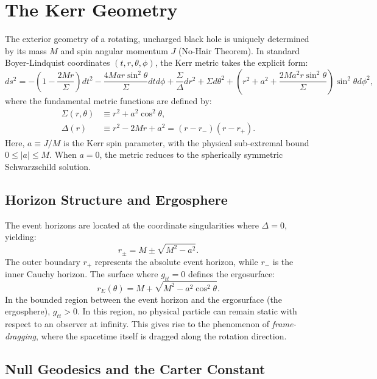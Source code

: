\documentclass[11pt]{book}
\begin{document}
\section{The Kerr Geometry}

The exterior geometry of a rotating, uncharged black hole is uniquely determined by its mass \(M\) and spin angular momentum \(J\) (No-Hair Theorem). In standard Boyer-Lindquist coordinates $(t, r, \theta, \phi)$, the Kerr metric takes the explicit form:
\begin{equation}
    ds^2 = -\left(1 - \frac{2Mr}{\Sigma}\right) dt^2 - \frac{4Mar\sin^2\theta}{\Sigma} dt d\phi + \frac{\Sigma}{\Delta} dr^2 + \Sigma d\theta^2 + \left(r^2 + a^2 + \frac{2Ma^2r\sin^2\theta}{\Sigma}\right)\sin^2\theta d\phi^2,
\end{equation}
where the fundamental metric functions are defined by:
\begin{align}
    \Sigma(r, \theta) &\equiv r^2 + a^2 \cos^2\theta, \\
    \Delta(r) &\equiv r^2 - 2Mr + a^2 = (r - r_-)(r - r_+).
\end{align}
Here, $a \equiv J/M$ is the Kerr spin parameter, with the physical sub-extremal bound $0 \leq |a| \leq M$. When $a = 0$, the metric reduces to the spherically symmetric Schwarzschild solution.

\subsection{Horizon Structure and Ergosphere}
The event horizons are located at the coordinate singularities where $\Delta = 0$, yielding:
\begin{equation}
    r_\pm = M \pm \sqrt{M^2 - a^2}.
\end{equation}
The outer boundary $r_+$ represents the absolute event horizon, while $r_-$ is the inner Cauchy horizon. The surface where $g_{tt} = 0$ defines the ergosurface:
\begin{equation}
    r_E(\theta) = M + \sqrt{M^2 - a^2\cos^2\theta}.
\end{equation}
In the bounded region between the event horizon and the ergosurface (the ergosphere), $g_{tt} > 0$. In this region, no physical particle can remain static with respect to an observer at infinity. This gives rise to the phenomenon of \textit{frame-dragging}, where the spacetime itself is dragged along the rotation direction.

\subsection{Null Geodesics and the Carter Constant}
\end{document}
